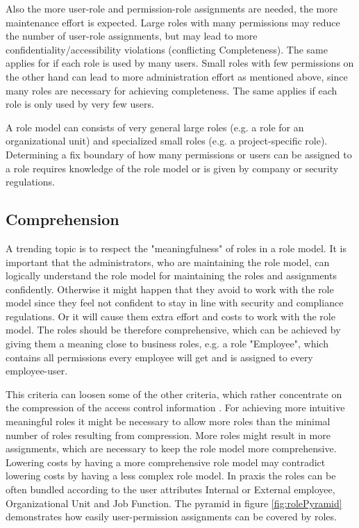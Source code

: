         Also the more user-role and permission-role assignments are needed, the more maintenance effort is expected. Large roles with many permissions may reduce the number of user-role assignments, but may lead to more confidentiality/accessibility violations (conflicting Completeness). The same applies for if each role is used by many users. Small roles with few permissions on the other hand can lead to more administration effort as mentioned above, since many roles are necessary for achieving completeness. The same applies if each role is only used by very few users.
        
        A role model can consists of very general large roles (e.g. a role for an organizational unit) and specialized small roles (e.g. a project-specific role). Determining a fix boundary of how many permissions or users can be assigned to a role requires knowledge of the role model or is given by company or security regulations.
        
        \subsection{Comprehension}
        \label{sec:comprehension}
        A trending topic is to respect the "meaningfulness" of roles in a role model\cite{Xu}\cite{Frank}. It is important that the administrators, who are maintaining the role model, can logically understand the role model for maintaining the roles and assignments confidently. Otherwise it might happen that they avoid to work with the role model since they feel not confident to stay in line with security and compliance regulations. Or it will cause them extra effort and costs to work with the role model. The roles should be therefore comprehensive, which can be achieved by giving them a meaning close to business roles, e.g. a role "Employee", which contains all permissions every employee will get and is assigned to every employee-user.
        
        This criteria can loosen some of the other criteria, which rather concentrate on the compression of the access control information \cite{Frank:2013}. For achieving more intuitive meaningful roles it might be necessary to allow more roles than the minimal number of roles resulting from compression. More roles might result in more assignments, which are necessary to keep the role model more comprehensive. Lowering costs by having a more comprehensive role model may contradict lowering costs by having a less complex role model.
        \iffalse
        In praxis the roles can be often bundled according to the user attributes Internal or External employee, Organizational Unit and Job Function. The pyramid in figure \ref{fig:rolePyramid} demonstrates how easily user-permission assignments can be covered by roles.
        
